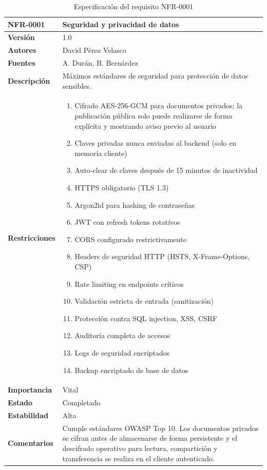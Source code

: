 \documentclass[11pt, a4paper]{article}
\begin{document}
\begin{table}[H]
    \centering
    \small
    \begin{tabular}{|p{4cm}|p{10cm}|}
    \hline
    \textbf{NFR-0001} & Seguridad y privacidad de datos \\
    \hline
    \textbf{Versión} & 1.0 \\
    \hline
    \textbf{Autores} & David Pérez Velasco \\
    \hline
    \textbf{Fuentes} & A. Durán, B. Bernárdez \\
    \hline
    \textbf{Descripción} & Máximos estándares de seguridad para protección de datos sensibles. \\
    \hline
    \textbf{Restricciones} & 
    \begin{enumerate}
        \item Cifrado AES-256-GCM para documentos privados; la publicación pública solo puede realizarse de forma explícita y mostrando aviso previo al usuario
        \item Claves privadas nunca enviadas al backend (solo en memoria cliente)
        \item Auto-clear de claves después de 15 minutos de inactividad
        \item HTTPS obligatorio (TLS 1.3)
        \item Argon2id para hashing de contraseñas
        \item JWT con refresh tokens rotativos
        \item CORS configurado restrictivamente
        \item Headers de seguridad HTTP (HSTS, X-Frame-Options, CSP)
        \item Rate limiting en endpoints críticos
        \item Validación estricta de entrada (sanitización)
        \item Protección contra SQL injection, XSS, CSRF
        \item Auditoría completa de accesos
        \item Logs de seguridad encriptados
        \item Backup encriptado de base de datos
    \end{enumerate} \\
    \hline
    \textbf{Importancia} & Vital \\
    \hline
    \textbf{Estado} & Completado \\
    \hline
    \textbf{Estabilidad} & Alta \\
    \hline
    \textbf{Comentarios} & Cumple estándares OWASP Top 10. Los documentos privados se cifran antes de almacenarse de forma persistente y el descifrado operativo para lectura, compartición y transferencia se realiza en el cliente autenticado. \\
    \hline
    \end{tabular}
    \caption{Especificación del requisito NFR-0001}
\end{table}
\end{document}
